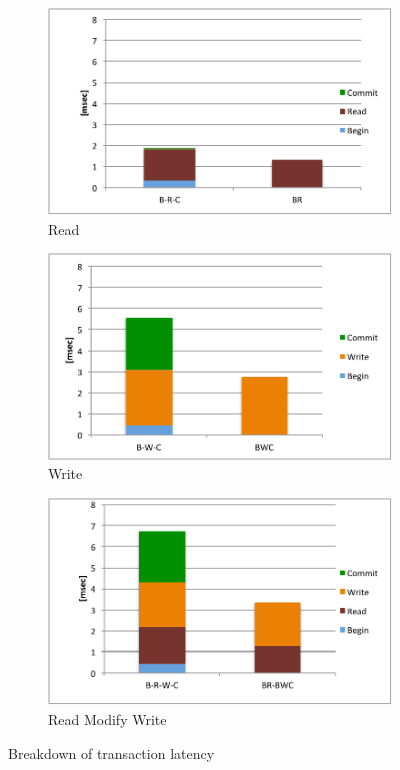 \begin{figure}[!h]
  \centering
  \begin{subfigure}[t]{0.3\textwidth}
	\includegraphics[width=\textwidth]{figs/read_latency.pdf}
	\caption[]{Read}
    \label{fig:latency:read}
  \end{subfigure}
  \begin{subfigure}[t]{0.3\textwidth}
	\includegraphics[width=\textwidth]{figs/write_latency.pdf}
	\caption[]{Write}
        \label{fig:latency:write}
  \end{subfigure}	
  \begin{subfigure}[t]{0.3\textwidth}
	\includegraphics[width=\textwidth]{figs/rmw_latency.pdf}
	\caption[]{Read Modify Write}
    \label{fig:latency:rmw}
  \end{subfigure}			
  \caption{Breakdown of transaction latency}
  \label{fig:latency}
\end{figure}


